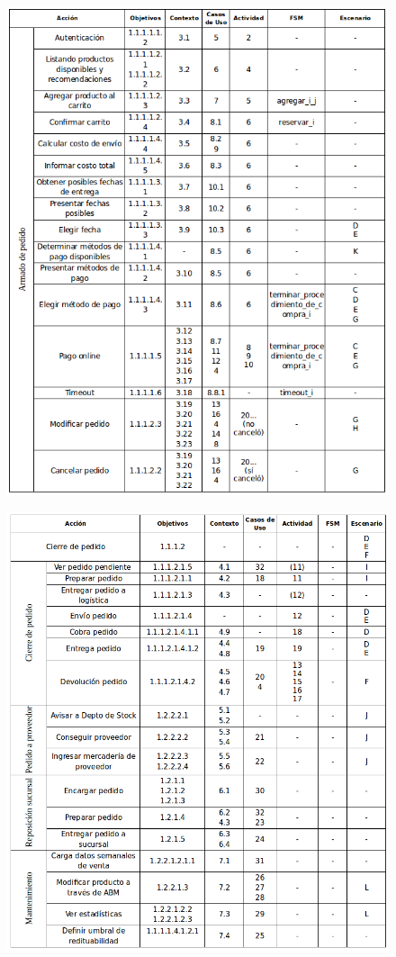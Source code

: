 \begin{figure}[H]
	\begin{center}
	\includegraphics[width=\textwidth]{imagenes/trazabilidad-armado-pedido.png}
	\end{center}
	\label{trazabilidad-armado-pedido}
\end{figure}

\begin{figure}[H]
	\begin{center}
	\includegraphics[width=\textwidth]{imagenes/trazabilidad-otros.png}
	\end{center}
	\label{trazabilidad-otros}
\end{figure}
